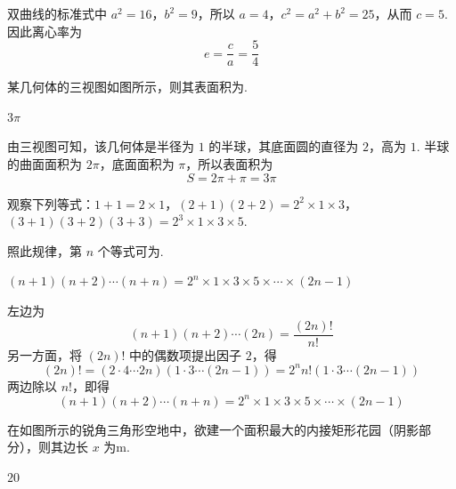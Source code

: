 \begin{solution}
双曲线的标准式中 \(a^2=16\)，\(b^2=9\)，所以 \(a=4\)，\(c^2=a^2+b^2=25\)，从而 \(c=5\). 因此离心率为
\[
e=\frac ca=\frac54
\]
\end{solution}

\begin{problem}
某几何体的三视图如图所示，则其表面积为\fillinblank{}.

\end{problem}

\begin{answer}
\(3\pi\)
\end{answer}

\begin{solution}
由三视图可知，该几何体是半径为 \(1\) 的半球，其底面圆的直径为 \(2\)，高为 \(1\). 半球的曲面面积为 \(2\pi\)，底面面积为 \(\pi\)，所以表面积为
\[
S=2\pi+\pi=3\pi
\]
\end{solution}

\begin{problem}
观察下列等式：\(1 + 1 = 2 \times 1\)，\((2 + 1)(2 + 2) = 2^{2} \times 1 \times 3\)，\((3 + 1)(3 + 2)(3 + 3) = 2^{3} \times 1 \times 3 \times 5\).

照此规律，第 \(n\) 个等式可为\fillinblank{}.
\end{problem}

\begin{answer}
\((n + 1)(n + 2)\cdots(n + n) = 2^{n} \times 1 \times 3 \times 5 \times \cdots \times (2n - 1)\)
\end{answer}

\begin{solution}
左边为
\[
(n+1)(n+2)\cdots(2n)=\frac{(2n)!}{n!}
\]
另一方面，将 \((2n)!\) 中的偶数项提出因子 \(2\)，得
\[
(2n)!=\left(2\cdot4\cdots2n\right)\left(1\cdot3\cdots(2n-1)\right)=2^n n!\left(1\cdot3\cdots(2n-1)\right)
\]
两边除以 \(n!\)，即得
\[
(n+1)(n+2)\cdots(n+n)=2^n\times1\times3\times5\times\cdots\times(2n-1)
\]
\end{solution}

\begin{problem}
在如图所示的锐角三角形空地中，欲建一个面积最大的内接矩形花园（阴影部分），则其边长 \(x\) 为\fillinblank{}\(\mathrm{m}\).
\end{problem}

\begin{answer}
\(20\)
\end{answer}

